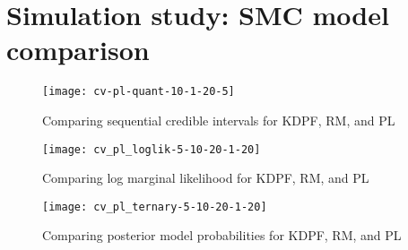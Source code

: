 \chapter{Simulation study: SMC model comparison \label{ch:comp}}

\begin{figure}
\ssp
\centering
\caption{Comparing sequential credible intervals for KDPF, RM, and PL} \label{fig:comp:quant}
\texttt{[image: cv-pl-quant-10-1-20-5]}
\end{figure}

\begin{figure}
\ssp
\centering
\caption{Comparing log marginal likelihood for KDPF, RM, and PL} \label{fig:comp:loglik}
\texttt{[image: cv\_pl\_loglik-5-10-20-1-20]}
\end{figure}

\begin{figure}
\ssp
\centering
\caption{Comparing posterior model probabilities for KDPF, RM, and PL} \label{fig:comp:post}
\texttt{[image: cv\_pl\_ternary-5-10-20-1-20]}
\end{figure}